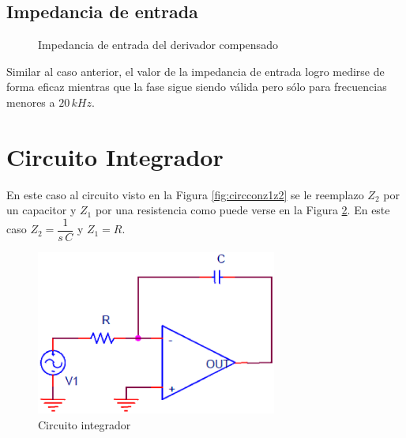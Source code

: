 \documentclass[11pt, a4paper]{article}
\begin{document}
\subsection{Impedancia de entrada}
\begin{figure}[H]
	\begin{center}
		\caption{Impedancia de entrada del derivador compensado}
		\label{fig:zinsuperDERivadorCompensado}
	\end{center}
\end{figure}

Similar al caso anterior, el valor de la impedancia de entrada logro medirse de forma eficaz mientras que la fase sigue siendo válida pero sólo para frecuencias menores a $20 \, kHz$.








\section{Circuito Integrador}
En este caso al circuito visto en la Figura \ref{fig:circconz1z2} se le reemplazo $Z_2$ por un capacitor y $Z_1$ por una resistencia como puede verse en la Figura \ref{fig:circuitointegrador}. En este caso $Z_2=\dfrac{1}{s \, C}$ y $Z_1= R$.

\begin{figure}[H]
\centering
\includegraphics[scale=0.5]{circuitointegrador.png}
\caption{Circuito integrador}
\label{fig:circuitointegrador}
\end{figure}
\end{document}
